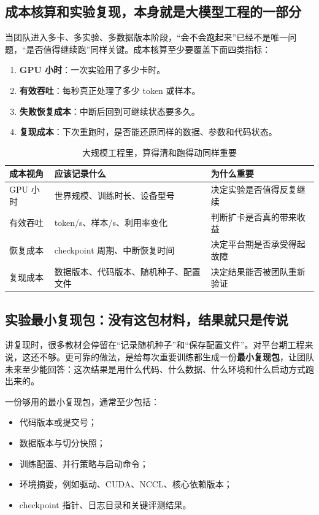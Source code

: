 \subsection{成本核算和实验复现，本身就是大模型工程的一部分}
当团队进入多卡、多实验、多数据版本阶段，“会不会跑起来”已经不是唯一问题，“是否值得继续跑”同样关键。成本核算至少要覆盖下面四类指标：
\begin{enumerate}
  \item \textbf{GPU 小时}：一次实验用了多少卡时。
  \item \textbf{有效吞吐}：每秒真正处理了多少 token 或样本。
  \item \textbf{失败恢复成本}：中断后回到可继续状态要多久。
  \item \textbf{复现成本}：下次重跑时，是否能还原同样的数据、参数和代码状态。
\end{enumerate}

\begin{table}[H]
\centering
\small
\begin{tabularx}{\textwidth}{>{\raggedright\arraybackslash}p{2.9cm}>{\raggedright\arraybackslash}p{3.2cm}>{\raggedright\arraybackslash}X}
\toprule
\textbf{成本视角} & \textbf{应该记录什么} & \textbf{为什么重要} \\
\midrule
GPU 小时 & 世界规模、训练时长、设备型号 & 决定实验是否值得反复继续 \\
有效吞吐 & token/s、样本/s、利用率变化 & 判断扩卡是否真的带来收益 \\
恢复成本 & checkpoint 周期、中断恢复时间 & 决定平台期是否承受得起故障 \\
复现成本 & 数据版本、代码版本、随机种子、配置文件 & 决定结果能否被团队重新验证 \\
\bottomrule
\end{tabularx}
\caption{大规模工程里，算得清和跑得动同样重要}
\label{tab:training-cost-view}
\end{table}

\subsection{实验最小复现包：没有这包材料，结果就只是传说}
讲复现时，很多教材会停留在“记录随机种子”和“保存配置文件”。对平台期工程来说，这还不够。更可靠的做法，是给每次重要训练都生成一份\textbf{最小复现包}，让团队未来至少能回答：这次结果是用什么代码、什么数据、什么环境和什么启动方式跑出来的。

一份够用的最小复现包，通常至少包括：
\begin{itemize}
  \item 代码版本或提交号；
  \item 数据版本与切分快照；
  \item 训练配置、并行策略与启动命令；
  \item 环境摘要，例如驱动、CUDA、NCCL、核心依赖版本；
  \item checkpoint 指针、日志目录和关键评测结果。
\end{itemize}

